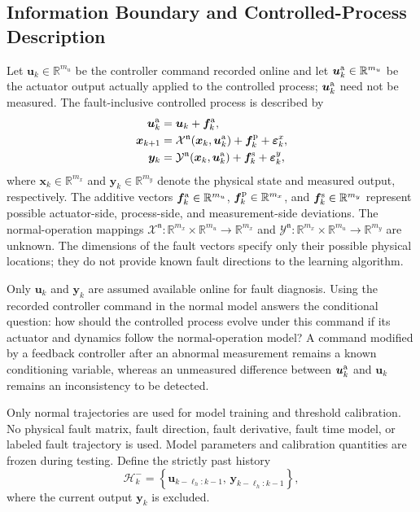 \documentclass[journal]{IEEEtran}
\newcommand{\1}{\bm 1}
\begin{document}
\subsection{Information Boundary and Controlled-Process Description}
Let $\bm u_k\in\mathbb R^{m_u}$ be the controller command recorded online and
let $\bm u_k^{\rm a}\in\mathbb R^{m_u}$ be the actuator output actually
applied to the controlled process; $\bm u_k^{\rm a}$ need not be measured.
The fault-inclusive controlled process is described by
\begin{equation}
\begin{aligned}
\bm u_k^{\rm a}&=\bm u_k+\bm f_k^{\rm a},\\
\bm x_{k+1}&=\mathcal X^{\mathfrak n}
(\bm x_k,\bm u_k^{\rm a})
+\bm f_k^{\rm p}+\bm\varepsilon_k^x,\\
\bm y_k&=\mathcal Y^{\mathfrak n}
(\bm x_k,\bm u_k^{\rm a})
+\bm f_k^{\rm s}+\bm\varepsilon_k^y,
\end{aligned}
\label{eq:controlled_process}
\end{equation}
where $\bm x_k\in\mathbb R^{m_x}$ and
$\bm y_k\in\mathbb R^{m_y}$ denote the physical state and measured output,
respectively. The additive vectors
$\bm f_k^{\rm a}\in\mathbb R^{m_u}$,
$\bm f_k^{\rm p}\in\mathbb R^{m_x}$, and
$\bm f_k^{\rm s}\in\mathbb R^{m_y}$ represent possible actuator-side,
process-side, and measurement-side deviations. The normal-operation mappings
$\mathcal X^{\mathfrak n}:\mathbb R^{m_x}\times\mathbb R^{m_u}
\rightarrow\mathbb R^{m_x}$ and
$\mathcal Y^{\mathfrak n}:\mathbb R^{m_x}\times\mathbb R^{m_u}
\rightarrow\mathbb R^{m_y}$ are unknown. The dimensions of the fault vectors
specify only their possible physical locations; they do not provide known
fault directions to the learning algorithm.

Only $\bm u_k$ and $\bm y_k$ are assumed available online for fault diagnosis.
Using the recorded controller command in the normal model answers the
conditional question: how should the controlled process evolve under this
command if its actuator and dynamics follow the normal-operation model? A
command modified by a feedback controller after an abnormal measurement
remains a known conditioning variable, whereas an unmeasured difference
between $\bm u_k^{\rm a}$ and $\bm u_k$ remains an inconsistency to be
detected.

Only normal trajectories are used for model training and threshold
calibration. No physical fault matrix, fault direction, fault derivative,
fault time model, or labeled fault trajectory is used. Model parameters and
calibration quantities are frozen during testing. Define the strictly past
history
\begin{equation}
\mathcal H_k^-=
\left\{\bm u_{k-\ell_h:k-1},\,
\bm y_{k-\ell_h:k-1}\right\},
\label{eq:history}
\end{equation}
where the current output $\bm y_k$ is excluded.
\end{document}
